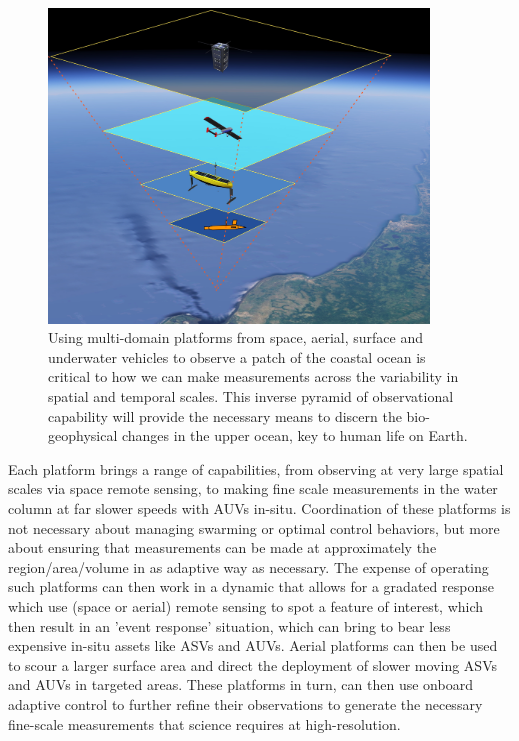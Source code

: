 \begin{figure}[!h]
  \centering
  \includegraphics[width=0.9\textwidth]{fig/inverse-pyramid.jpg}
  \caption{Using multi-domain platforms from space, aerial, surface
    and underwater vehicles to observe a patch of the coastal ocean is
    critical to how we can make measurements across the variability in
    spatial and temporal scales. This \textsf{inverse pyramid of
      observational} capability will provide the necessary means to
    discern the bio-geophysical changes in the upper ocean, key to
    human life on Earth.}
  \label{fig:inverse}
\end{figure}

Each platform brings a range of capabilities, from observing at very
large spatial scales via space remote sensing, to making fine scale
measurements in the water column at far slower speeds with AUVs
in-situ. Coordination of these platforms is not necessary about
managing swarming or optimal control behaviors, but more about
ensuring that measurements can be made at approximately the
region/area/volume in as adaptive way as necessary. The expense of
operating such platforms can then work in a dynamic that allows for a
gradated response which use (space or aerial) remote sensing to spot a
feature of interest, which then result in an 'event response'
situation, which can bring to bear less expensive in-situ assets like
ASVs and AUVs. Aerial platforms can then be used to scour a larger
surface area and direct the deployment of slower moving ASVs and AUVs
in targeted areas. These platforms in turn, can then use onboard
adaptive control to further refine their observations to generate the
necessary fine-scale measurements that science requires at
high-resolution.

